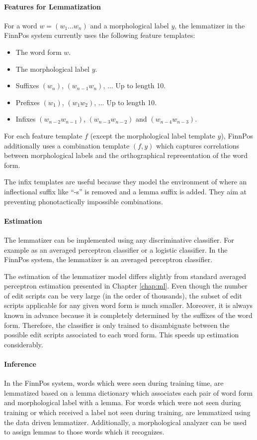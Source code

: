\paragraph{Features for Lemmatization} For a word $w = (w_1...w_n)$ and
a morphological label $y$, the lemmatizer in the FinnPos system
currently uses the following feature templates:
\begin{itemize}
\item The word form $w$.
\item The morphological label $y$.
\item Suffixes $(w_n)$, $(w_{n-1}w_n)$, ... Up to length 10.
\item Prefixes $(w_1)$, $(w_1w_2)$, ... Up to length 10.
\item Infixes $(w_{n-2}w_{n-1})$, $(w_{n-3}w_{n-2})$ and $(w_{n-4}w_{n-3})$.
\end{itemize}
For each feature template $f$ (except the morphological label template
$y$), FinnPos additionally uses a combination template $(f,y)$ which
captures correlations between morphological labels and the
orthographical representation of the word form.

The infix templates are useful because they model the environment of
where an inflectional suffix like ``-s'' is removed and a lemma suffix
is added. They aim at preventing phonotactically impossible
combinations.

\paragraph{Estimation} The lemmatizer can be implemented using any
discriminative classifier. For example as an averaged perceptron
classifier or a logistic classifier. In the FinnPos system, the
lemmatizer is an averaged perceptron classifier.

The estimation of the lemmatizer model differs slightly from standard
averaged perceptron estimation presented in Chapter
\ref{chap:ml}. Even though the number of edit scripts can be very
large (in the order of thousands), the subset of edit scripts
applicable for any given word form is much smaller. Moreover, it is
always known in advance because it is completely determined by the
suffixes of the word form. Therefore, the classifier is only trained
to disambiguate between the possible edit scripts associated to each
word form. This speeds up estimation considerably.

\paragraph{Inference} In the FinnPos system, words which were seen
during training time, are lemmatized based on a lemma dictionary which
associates each pair of word form and morphological label with a
lemma. For words which were not seen during training or which received
a label not seen during training, are lemmatized using the data driven
lemmatizer. Additionally, a morphological analyzer can be used to
assign lemmas to those words which it recognizes.

